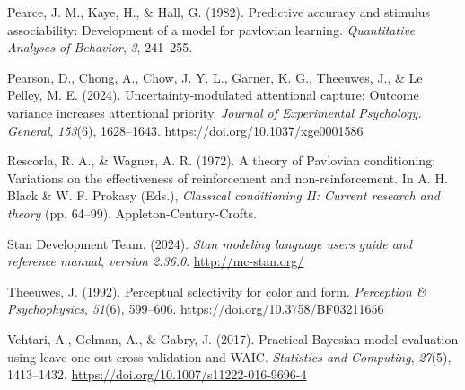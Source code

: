 \documentclass[11pt]{article}
\newlength{\cslhangindent}
\newenvironment{CSLReferences}[2] %
 {\begin{list}{}{%
  \setlength{\itemindent}{0pt}
  \setlength{\leftmargin}{0pt}
  \setlength{\parsep}{0pt}
  \ifodd #1
   \setlength{\leftmargin}{\cslhangindent}
   \setlength{\itemindent}{-1\cslhangindent}
  \fi
  \setlength{\itemsep}{#2\baselineskip}}}
 {\end{list}}
\begin{document}
\begin{CSLReferences}{1}{0}
Pearce, J. M., Kaye, H., \& Hall, G. (1982). Predictive accuracy and
stimulus associability: Development of a model for pavlovian learning.
\emph{Quantitative Analyses of Behavior}, \emph{3}, 241--255.

Pearson, D., Chong, A., Chow, J. Y. L., Garner, K. G., Theeuwes, J., \&
Le Pelley, M. E. (2024). Uncertainty-modulated attentional capture:
Outcome variance increases attentional priority. \emph{Journal of
Experimental Psychology. General}, \emph{153}(6), 1628--1643.
\url{https://doi.org/10.1037/xge0001586}

Rescorla, R. A., \& Wagner, A. R. (1972). A theory of {P}avlovian
conditioning: Variations on the effectiveness of reinforcement and
non-reinforcement. In A. H. Black \& W. F. Prokasy (Eds.),
\emph{Classical conditioning {II}: {C}urrent research and theory} (pp.
64--99). Appleton-Century-Crofts.

Stan Development Team. (2024). \emph{Stan modeling language users guide
and reference manual, version 2.36.0}. \url{http://mc-stan.org/}

Theeuwes, J. (1992). Perceptual selectivity for color and form.
\emph{Perception \& Psychophysics}, \emph{51}(6), 599--606.
\url{https://doi.org/10.3758/BF03211656}

Vehtari, A., Gelman, A., \& Gabry, J. (2017). Practical {Bayesian} model
evaluation using leave-one-out cross-validation and {WAIC}.
\emph{Statistics and Computing}, \emph{27}(5), 1413--1432.
\url{https://doi.org/10.1007/s11222-016-9696-4}

\end{CSLReferences}
\end{document}
